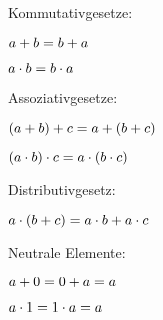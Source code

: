 Kommutativgesetze:\medskip\par
\formnum\ensuremath{\ca\opadd\cb=\cb\opadd\ca}\smallskip\par
\formnum\ensuremath{\ca\opmul\cb=\cb\opmul\ca}\medskip\par

Assoziativgesetze:\medskip\par
\formnum\ensuremath{(\ca\opadd\cb)\opadd\cc=\ca\opadd(\cb\opadd\cc)}\smallskip\par
\formnum\ensuremath{(\ca\opmul\cb)\opmul\cc=\ca\opmul(\cb\opmul\cc)}\medskip\par

Distributivgesetz:\medskip\par
\formnum\ensuremath{\ca\opmul(\cb\opadd\cc)=\ca\opmul\cb\opadd\ca\opmul\cc}\medskip\par

Neutrale Elemente:\medskip\par
\formnum\ensuremath{\ca\opadd0=0\opadd\ca=\ca}\smallskip\par
\formnum\ensuremath{\ca\opmul1=1\opmul\ca=\ca}

